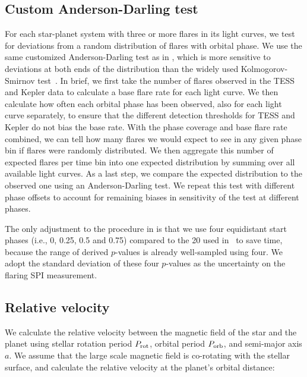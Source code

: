 \documentclass[twocolumn]{aastex631}
\begin{document}
\subsection{Custom Anderson-Darling test}
\label{sec:methods:adtest}
For each star-planet system with three or more flares in its light curves, we test for deviations from a random distribution of flares with orbital phase. We use the same customized Anderson-Darling test as in \cite{ilin2022searching}, which is more sensitive to deviations at both ends of the distribution than the widely used Kolmogorov-Smirnov test~\citep{feigelson2012modern}. In brief, we first take the number of flares observed in the TESS and Kepler data to calculate a base flare rate for each light curve. We then calculate how often each orbital phase has been observed, also for each light curve separately, to ensure that the different detection thresholds for TESS and Kepler do not bias the base rate. With the phase coverage and base flare rate combined, we can tell how many flares we would expect to see in any given phase bin if flares were randomly distributed. We then aggregate this number of expected flares per time bin into one expected distribution by summing over all available light curves. As a last step, we compare the expected distribution to the observed one using an Anderson-Darling test. We repeat this test with different phase offsets to account for remaining biases in sensitivity of the test at different phases.

The only adjustment to the procedure in \cite{ilin2022searching} is that we use four equidistant start phases (i.e., 0, 0.25, 0.5 and 0.75) compared to the 20 used in~\cite{ilin2022searching} to save time, because the range of derived $p$-values is already well-sampled using four. We adopt the standard deviation of these four $p$-values as the uncertainty on the flaring SPI measurement.



\subsection{Relative velocity}
\label{sec:methods:relvel}
We calculate the relative velocity between the magnetic field of the star and the planet using stellar rotation period $P_{\rm rot}$, orbital period $P_{\rm orb}$, and semi-major axis $a$. We assume that the large scale magnetic field is co-rotating with the stellar surface, and calculate the relative velocity at the planet's orbital distance:
\end{document}
